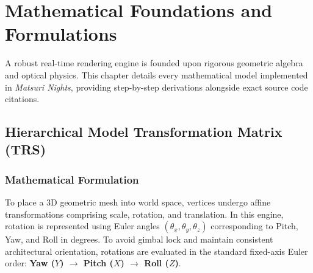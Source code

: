 \chapter{Mathematical Foundations and Formulations}
\label{chap:math}

A robust real-time rendering engine is founded upon rigorous geometric algebra and optical physics. This chapter details every mathematical model implemented in \textit{Matsuri Nights}, providing step-by-step derivations alongside exact source code citations.

\section{Hierarchical Model Transformation Matrix (TRS)}
\subsection{Mathematical Formulation}
To place a 3D geometric mesh into world space, vertices undergo affine transformations comprising scale, rotation, and translation. In this engine, rotation is represented using Euler angles $(\theta_x, \theta_y, \theta_z)$ corresponding to Pitch, Yaw, and Roll in degrees. To avoid gimbal lock and maintain consistent architectural orientation, rotations are evaluated in the standard fixed-axis Euler order: \textbf{Yaw ($Y$) $\to$ Pitch ($X$) $\to$ Roll ($Z$)}.

